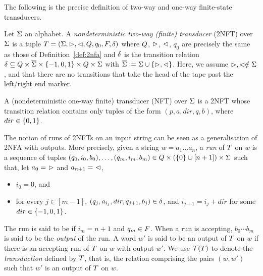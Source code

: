 The following is the precise definition
of two-way and one-way finite-state transducers.
\begin{definition}
    Let $\Sigma$ an alphabet.
    A \emph{nondeterministic two-way (finite) \emph{transducer}} (2NFT) over 
    $\Sigma$ is a tuple $T = (\Sigma, \vartriangleright, \vartriangleleft, Q, q_0, F, \delta)$ where  $Q$, $\vartriangleright$, $\vartriangleleft$, $q_0$ are precisely the same as those of Definition~\ref{def:2nfa}
%
and 
    $\delta$ is the
transition relation  $\delta\subseteq Q \times 
    \overline{\Sigma}\times \{-1, 0, 1\}\times 
    Q \times \Sigma$ with
    $\overline{\Sigma} := \Sigma \cup \{\vartriangleright,\vartriangleleft\}$.
    Here, we assume $\vartriangleright, \vartriangleleft \notin \Sigma$, and that
    there are no transitions that take the head of the tape past the left/right
    end marker. 

    A (nondeterministic one-way finite) transducer (NFT) over
    $\Sigma$
    is a 2NFT whose transition relation contains only tuples of the form
    $(p,a,dir,q,b)$, where $dir \in \{0,1\}$.
\end{definition}



The notion of runs of 2NFTs on an input string can be seen as a generalisation of 2NFA with outputs. More precisely, given a string $w = a_1 \dots a_n$, a \emph{run} of $T$ on $w$
is a
sequence of tuples $(q_0, i_0, b_0),\ldots, (q_m, i_m, b_m) \in Q \times (\{0\} \cup [n+1]) \times \Sigma$ 
such that, let $a_0 =\ \EndLeft$ and $a_{n+1} =\ \EndRight$, %
\begin{itemize}
    \item $i_0 = 0$, and
    \item for every $j \in [m-1]$, $(q_j, a_{i_j}, dir, q_{j+1}, b_j) \in
        \delta$, and $i_{j+1} = i_j + dir$ for some $dir \in \{-1, 0, 1\}$.
\end{itemize}
The run is said to be  if $i_m = n+1$ and $q_m \in F$. When a run is accepting, $b_0 \cdots b_m$ is said to be the \emph{output} of the run.
A word $w'$ is said to be an output of $T$ on $w$ if there is an accepting run of
$T$ on $w$ with output $w'$. We use $\mathcal{T}(T)$ to denote the \emph{transduction} defined by $T$, that is, the relation comprising the pairs $(w,w')$ such that $w'$ is an output of $T$ on $w$.

